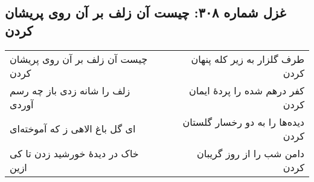 \begin{center}
\section*{غزل شماره ۳۰۸: چیست آن زلف بر آن روی پریشان کردن}
\label{sec:308}
\begin{longtable}{l p{0.5cm} r}
چیست آن زلف بر آن روی پریشان کردن
&&
طرف گلزار به زیر کله پنهان کردن
\\
زلف را شانه زدی باز چه رسم آوردی
&&
کفر درهم شده را پردهٔ ایمان کردن
\\
ای گل باغ الاهی ز که آموخته‌ای
&&
دیده‌ها را به دو رخسار گلستان کردن
\\
خاک در دیدهٔ خورشید زدن تا کی ازین
&&
دامن شب را از روز گریبان کردن
\\
\end{longtable}
\end{center}
